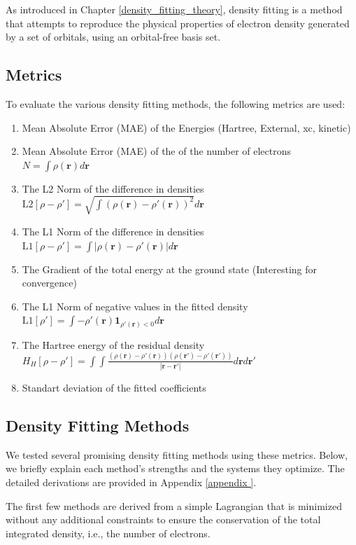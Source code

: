 As introduced in Chapter \ref{density_fitting_theory}, density fitting is a method that attempts to reproduce the physical properties of electron density generated by a set of orbitals, using an orbital-free basis set.
\subsection{Metrics} \label{metrics}
To evaluate the various density fitting methods, the following metrics are used:
\begin{enumerate}
    \item Mean Absolute Error (MAE) of the Energies (Hartree, External, xc, kinetic)
    \item Mean Absolute Error (MAE) of the of the number of electrons $N = \int \rho(\mathbf{r}) d\mathbf{r}$
    \item The L2 Norm of the difference in densities $\text{L2}[\rho-\rho'] = \sqrt{\int (\rho(\mathbf{r})-\rho'(\mathbf{r}))^2} d\mathbf{r}$
    \item The L1 Norm of the difference in densities $\text{L1}[\rho-\rho'] = \int |\rho(\mathbf{r})-\rho'(\mathbf{r})| d\mathbf{r}$
    \item The Gradient of the total energy at the ground state (Interesting for convergence)
    \item The L1 Norm of negative values in the fitted density $\text{L1}[\rho'] = \int -\rho'(\mathbf{r})\mathbf{1}_{\rho'(\mathbf{r})<0} d\mathbf{r}$
    \item The Hartree energy of the residual density $H_{H}[\rho-\rho'] = \int \int \frac{(\rho(\mathbf{r})-\rho'(\mathbf{r}))(\rho(\mathbf{r'})-\rho'(\mathbf{r'}))}{|\mathbf{r}-\mathbf{r'}|}d\mathbf{r}d\mathbf{r'}$
    \item Standart deviation of the fitted coefficients
\end{enumerate}
\subsection{Density Fitting Methods}

We tested several promising density fitting methods using these metrics. Below, we briefly explain each method’s strengths and the systems they optimize. The detailed derivations are provided in Appendix \ref{appendix
}.

The first few methods are derived from a simple Lagrangian that is minimized without any additional constraints to ensure the conservation of the total integrated density, i.e., the number of electrons.
